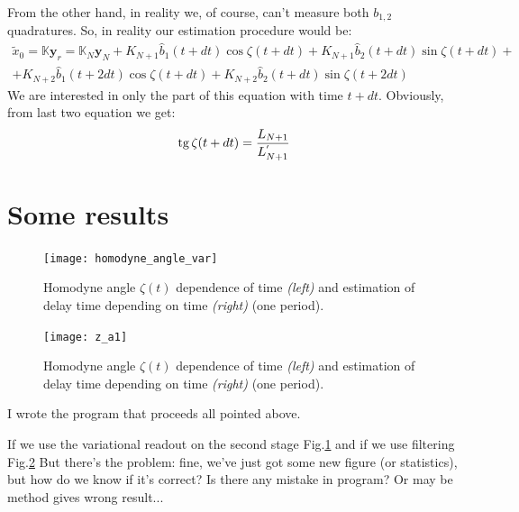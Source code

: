\documentclass[notitlepage,a4paper,11pt,hyperref=pdftex]{revtex4-1}
\renewcommand{\tan}{\mathop{\rm tg}\nolimits}
\begin{document}
\begin{enumerate}
From the other hand, in reality we, of course, can't measure both $b_{1,2}$ quadratures. So, in reality our estimation procedure would be:
\begin{multline}\label{x0meas}
 \tilde{x}_0 = \mathbb{K}\mathbf{y}_r = \mathbb{K}_N\mathbf{y}_N + K_{N+1}\hat{b}_1(t+dt)\cos\zeta(t+dt)+K_{N+1}\hat{b}_2(t+dt)\sin\zeta(t+dt)+\\+ K_{N+2}\hat{b}_1(t+2dt)\cos\zeta(t+dt)+K_{N+2}\hat{b}_2(t+dt)\sin\zeta(t+2dt)
\end{multline}
We are interested in only the part of this equation with time $t+dt$. Obviously, from last two equation we get:
\begin{equation}
 \tan \zeta(t+dt) = \frac{L_{N+1}}{L_{N+1}^{'}}
\end{equation}
\end{enumerate}
\section{Some results}
\begin{figure}
 \begin{minipage}{0.45\linewidth}
  \texttt{[image: homodyne\_angle\_var]}
 \end{minipage}
\hfill
 \begin{minipage}{0.45\linewidth}
 \end{minipage}
\caption{Homodyne angle $\zeta(t)$ dependence of time \textit{(left)} and estimation of delay time depending on time \textit{(right)} (one period).}
\label{pic:hom}
\end{figure}
\begin{figure}
 \begin{minipage}{0.45\linewidth}
  \texttt{[image: z\_a1]}
 \end{minipage}
\hfill
 \begin{minipage}{0.45\linewidth}
 \end{minipage}
\caption{Homodyne angle $\zeta(t)$ dependence of time \textit{(left)} and estimation of delay time depending on time \textit{(right)} (one period).}
\label{pic:filt}
\end{figure}
I wrote the program that proceeds all pointed above.

If we use the variational readout on the second stage Fig.\ref{pic:hom} and if we use filtering Fig.\ref{pic:filt}
But there's the problem: fine, we've just got some new figure (or statistics), but how do we know if it's correct? Is there any mistake in program? Or may be method gives wrong result...
\end{document}
